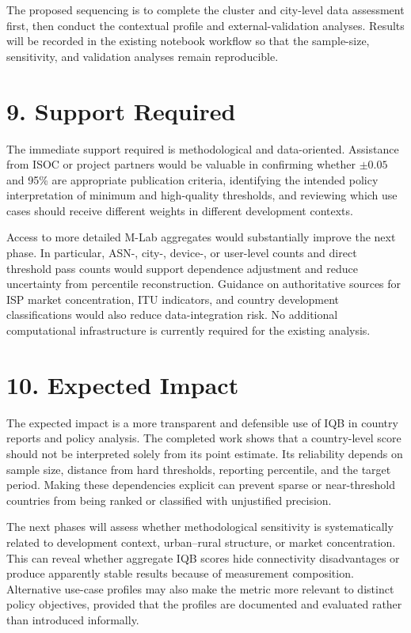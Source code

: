 \documentclass[11pt]{article}
\begin{document}
The proposed sequencing is to complete the cluster and city-level data assessment first, then conduct
the contextual profile and external-validation analyses. Results will be recorded in the existing
notebook workflow so that the sample-size, sensitivity, and validation analyses remain reproducible.

\section*{9. Support Required}

The immediate support required is methodological and data-oriented. Assistance from ISOC or project
partners would be valuable in confirming whether $\pm0.05$ and 95\% are appropriate publication criteria,
identifying the intended policy interpretation of minimum and high-quality thresholds, and reviewing
which use cases should receive different weights in different development contexts.

Access to more detailed M-Lab aggregates would substantially improve the next phase. In particular,
ASN-, city-, device-, or user-level counts and direct threshold pass counts would support dependence
adjustment and reduce uncertainty from percentile reconstruction. Guidance on authoritative sources for
ISP market concentration, ITU indicators, and country development classifications would also reduce
data-integration risk. No additional computational infrastructure is currently required for the
existing analysis.

\section*{10. Expected Impact}

The expected impact is a more transparent and defensible use of IQB in country reports and policy
analysis. The completed work shows that a country-level score should not be interpreted solely from its
point estimate. Its reliability depends on sample size, distance from hard thresholds, reporting
percentile, and the target period. Making these dependencies explicit can prevent sparse or
near-threshold countries from being ranked or classified with unjustified precision.

The next phases will assess whether methodological sensitivity is systematically related to development
context, urban--rural structure, or market concentration. This can reveal whether aggregate IQB scores
hide connectivity disadvantages or produce apparently stable results because of measurement composition.
Alternative use-case profiles may also make the metric more relevant to distinct policy objectives,
provided that the profiles are documented and evaluated rather than introduced informally.
\end{document}
